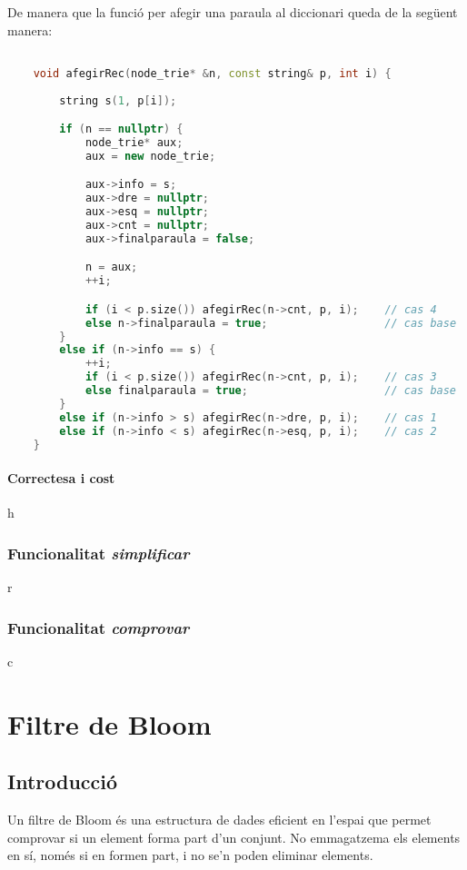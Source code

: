 \documentclass[titlepage]{article}
\begin{document}
De manera que la funció per afegir una paraula al diccionari queda de la següent manera:

\begin{lstlisting}[language=C++]

    void afegirRec(node_trie* &n, const string& p, int i) {
    
        string s(1, p[i]);

        if (n == nullptr) {
            node_trie* aux;
            aux = new node_trie;

            aux->info = s;
            aux->dre = nullptr;
            aux->esq = nullptr;
            aux->cnt = nullptr;
            aux->finalparaula = false;

            n = aux;
            ++i;

            if (i < p.size()) afegirRec(n->cnt, p, i);    // cas 4
            else n->finalparaula = true;                  // cas base
        }
        else if (n->info == s) {
            ++i;
            if (i < p.size()) afegirRec(n->cnt, p, i);    // cas 3
            else finalparaula = true;                     // cas base
        }
        else if (n->info > s) afegirRec(n->dre, p, i);    // cas 1
        else if (n->info < s) afegirRec(n->esq, p, i);    // cas 2
    }

\end{lstlisting}
\clearpage
\paragraph{Correctesa i cost}
h
\subsubsection{Funcionalitat \textit{simplificar}}
r
\subsubsection{Funcionalitat \textit{comprovar}}
c

\clearpage
\section{Filtre de Bloom}
\subsection{Introducció}
Un filtre de Bloom és una estructura de dades eficient en l'espai que permet comprovar si un element forma part d'un conjunt. No emmagatzema els elements en sí, només si en formen part, i no se'n poden eliminar elements.
\end{document}
